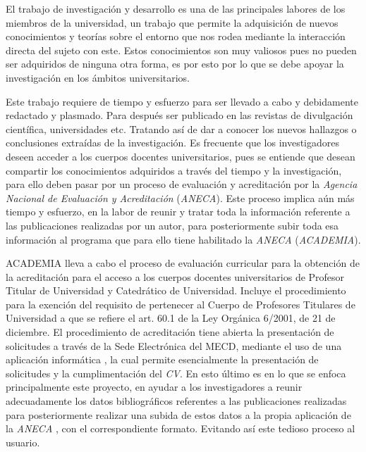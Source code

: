 
El trabajo de investigación y desarrollo es una de las principales labores de los miembros de la universidad, un trabajo que permite la adquisición de nuevos conocimientos y teorías sobre el entorno que nos rodea mediante la interacción directa del sujeto con este. Estos conocimientos son muy valiosos pues no pueden ser adquiridos de ninguna otra forma, es por esto por lo que se debe apoyar la investigación en los ámbitos universitarios.

Este trabajo requiere de tiempo y esfuerzo para ser llevado a cabo y debidamente redactado y plasmado. Para después ser publicado en las revistas de divulgación científica, universidades etc. Tratando así de dar a conocer los nuevos hallazgos o conclusiones extraídas de la investigación. Es frecuente que los investigadores deseen acceder a los cuerpos docentes universitarios, pues se entiende que desean compartir los conocimientos adquiridos a través del tiempo y la investigación, para ello deben pasar por un proceso de evaluación y acreditación por la \emph{Agencia Nacional de Evaluación y Acreditación} (\emph{ANECA}). Este proceso implica aún más tiempo y esfuerzo, en la labor de reunir y tratar toda la información referente a las publicaciones realizadas por un autor, para posteriormente subir toda esa información al programa que para ello tiene habilitado la \emph {ANECA} (\emph{ACADEMIA}).

ACADEMIA lleva a cabo el proceso de evaluación curricular para la obtención de la acreditación para el acceso a los cuerpos docentes universitarios de Profesor Titular de Universidad y Catedrático de Universidad.
Incluye el procedimiento para la exención del requisito de pertenecer al Cuerpo de Profesores Titulares de Universidad a que se refiere el art. 60.1 de la Ley Orgánica 6/2001, de 21 de diciembre\cite{aneca}. El procedimiento de acreditación tiene abierta la presentación de solicitudes a través de la Sede Electrónica del MECD\cite {mecd}, mediante el uso de una aplicación informática \cite {aneca_app}, la cual permite esencialmente la presentación de solicitudes y la cumplimentación del \emph{CV}.
En esto último es en lo que se enfoca principalmente este proyecto, en ayudar a los investigadores a reunir adecuadamente los datos bibliográficos referentes a las publicaciones realizadas para posteriormente realizar una subida de estos datos a la propia aplicación de la \emph{ANECA} , con el correspondiente formato. Evitando así este tedioso proceso al usuario.

